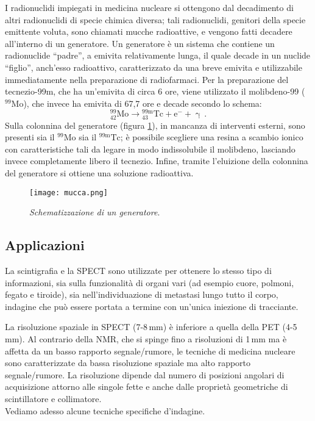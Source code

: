 \documentclass{report}
\newcommand{\virgolette}[1]{``#1''}
\newcommand{\figref}[1]{figura \ref{#1}}
\numberwithin{equation}{section}
\numberwithin{figure}{section}
\begin{document}
I radionuclidi impiegati in medicina nucleare si ottengono dal decadimento di altri radionuclidi di specie chimica diversa; tali radionuclidi, genitori della specie emittente voluta, sono chiamati mucche radioattive, e vengono fatti decadere all'interno di un generatore. Un generatore è un sistema che contiene un radionuclide \virgolette{padre}, a emivita relativamente lunga, il quale decade in un nuclide \virgolette{figlio}, anch'esso radioattivo, caratterizzato da una breve emivita e utilizzabile immediatamente nella preparazione di radiofarmaci.
Per la preparazione del tecnezio-99m, che ha un'emivita di circa 6 ore, viene utilizzato il molibdeno-99 ($\mathrm{^{99}Mo}$), che invece ha emivita di 67,7 ore e decade secondo lo schema:
\begin{equation*}
    \mathrm{^{99}_{42}Mo} \to \mathrm{^{99m}_{43}Tc} + \mathrm{e}^- + \upgamma\,.
\end{equation*}
Sulla colonnina del generatore (\figref{fig:mucca}), in mancanza di interventi esterni, sono  presenti sia il $\mathrm{^{99}Mo}$ sia il $\mathrm{^{99m}Tc}$; è possibile scegliere una resina a scambio ionico con caratteristiche tali da legare in modo indissolubile il molibdeno, lasciando invece completamente libero il tecnezio. Infine, tramite l’eluizione della colonnina del generatore si ottiene una soluzione radioattiva.

\begin{figure}[htp]
    \centering
    \texttt{[image: mucca.png]}
    \caption{\label{fig:mucca} \textit{Schematizzazione di un generatore}.}
\end{figure}

\subsection{Applicazioni}
La scintigrafia e la SPECT sono utilizzate per ottenere lo stesso tipo di informazioni, sia sulla funzionalità di organi vari (ad esempio cuore, polmoni, fegato e tiroide), sia nell'individuazione di metastasi lungo tutto il corpo, indagine che può essere portata a termine con un'unica iniezione di tracciante.

La risoluzione spaziale in SPECT (7-8\,mm) è inferiore a quella della PET (4-5\,mm). Al contrario della NMR, che si spinge fino a risoluzioni di 1\,mm ma è affetta da un basso rapporto segnale/rumore, le tecniche di medicina nucleare sono caratterizzate da bassa risoluzione spaziale ma alto rapporto segnale/rumore. La risoluzione dipende dal numero di posizioni angolari di acquisizione attorno alle singole fette e anche dalle proprietà geometriche di scintillatore e collimatore.\\
Vediamo adesso alcune tecniche specifiche d'indagine.
\end{document}
